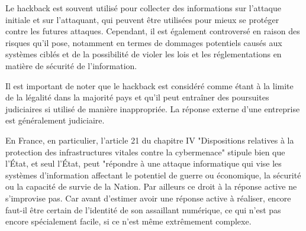 Le hackback est souvent utilisé pour collecter des informations sur l'attaque initiale et sur l'attaquant, qui peuvent être utilisées pour mieux se protéger contre les futures attaques. Cependant, il est également controversé en raison des risques qu'il pose, notamment en termes de dommages potentiels causés aux systèmes ciblés et de la possibilité de violer les lois et les réglementations en matière de sécurité de l'information.

Il est important de noter que le hackback est  considéré comme étant à la limite de la légalité dans la majorité pays et qu'il peut entraîner des poursuites judiciaires si utilisé de manière inappropriée. La réponse externe d'une entreprise est généralement judiciaire. 

En France, en particulier, l'article 21 du chapitre IV "Dispositions relatives à la protection des infrastructures vitales contre la cybermenace" stipule bien que l'État, et seul l'État, peut "répondre à une attaque informatique qui vise les systèmes d’information affectant le potentiel de guerre ou économique, la sécurité ou la capacité de survie de la Nation.
Par ailleurs ce droit à la réponse active ne s'improvise pas. Car avant d'estimer avoir une réponse active à réaliser, encore faut-il être certain de l'identité de son assaillant numérique, ce qui n'est pas encore spécialement facile, si ce n'est même extrêmement complexe.


